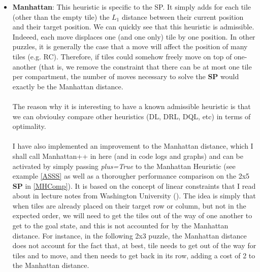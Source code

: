 \begin{itemize}
\item \textbf{Manhattan}: This heuristic is specific to the SP. It simply adds for each tile (other than the empty tile) the $L_{1}$ distance between their current position and their target position. We can quickly see that this heuristic is admissible. Indeeed, each move displaces one (and one only) tile by one position. In other puzzles, it is generally the case that a move will affect the position of many tiles (e.g. RC). Therefore, if tiles could somehow freely move on top of one-another (that is, we remove the constraint that there can be at most one tile per compartment, the number of moves necessary to solve the \textbf{SP} would exactly be the Manhattan distance.
\\
\\
The reason why it is interesting to have a known admissible heuristic is that we can obvioulsy compare other heuristics (DL, DRL, DQL, etc) in terms of optimality.
\\
\\
I have also implemented an improvement to the Manhattan distance, which I shall call Manhattan++ in here (and in code logs and graphs) and can be activated by simply passing \textit{plus=True} to the Manhattan Heuristic (see example \ref{ASSS} as well as a thorougher performance comparison on the 2x5 \textbf{SP} in \ref{MHComp}). It is based on the concept of linear constraints that I read about in lecture notes from Washington University (\cite{SlidingPuzzleLectureNotes}). The idea is simply that when tiles are already placed on their target row or column, but not in the expected order, we will need to get the tiles out of the way of one another to get to the goal state, and this is not accounted for by the Manhattan distance. For instance, in the following 2x3 puzzle, the Manhattan distance does not account for the fact that, at best, tile  \black needs to get out of the way for tiles  \black and  \black to move, and then needs to get back in its row, adding a cost of 2 to the Manhattan distance.

\begin{center}
\begin{five}
\end{five}
\end{center}


\end{itemize}
